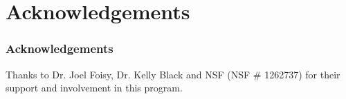 \documentclass{beamer}   %
\begin{document}
\section{Acknowledgements}

\begin{frame}
    \frametitle{Acknowledgements}
	Thanks to Dr. Joel Foisy, Dr. Kelly Black and NSF (NSF \# 1262737) for their support and involvement in this program.
\end{frame}
\end{document}
